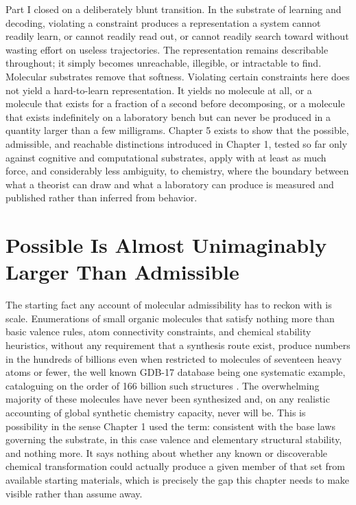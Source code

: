 \documentclass[11pt]{book}
\begin{document}
Part I closed on a deliberately blunt transition. In the substrate of learning and decoding, violating a constraint produces a representation a system cannot readily learn, or cannot readily read out, or cannot readily search toward without wasting effort on useless trajectories. The representation remains describable throughout; it simply becomes unreachable, illegible, or intractable to find. Molecular substrates remove that softness. Violating certain constraints here does not yield a hard-to-learn representation. It yields no molecule at all, or a molecule that exists for a fraction of a second before decomposing, or a molecule that exists indefinitely on a laboratory bench but can never be produced in a quantity larger than a few milligrams. Chapter 5 exists to show that the possible, admissible, and reachable distinctions introduced in Chapter 1, tested so far only against cognitive and computational substrates, apply with at least as much force, and considerably less ambiguity, to chemistry, where the boundary between what a theorist can draw and what a laboratory can produce is measured and published rather than inferred from behavior.

\section{Possible Is Almost Unimaginably Larger Than Admissible}

The starting fact any account of molecular admissibility has to reckon with is scale. Enumerations of small organic molecules that satisfy nothing more than basic valence rules, atom connectivity constraints, and chemical stability heuristics, without any requirement that a synthesis route exist, produce numbers in the hundreds of billions even when restricted to molecules of seventeen heavy atoms or fewer, the well known GDB-17 database being one systematic example, cataloguing on the order of 166 billion such structures \cite{reymond2015}. The overwhelming majority of these molecules have never been synthesized and, on any realistic accounting of global synthetic chemistry capacity, never will be. This is possibility in the sense Chapter 1 used the term: consistent with the base laws governing the substrate, in this case valence and elementary structural stability, and nothing more. It says nothing about whether any known or discoverable chemical transformation could actually produce a given member of that set from available starting materials, which is precisely the gap this chapter needs to make visible rather than assume away.
\end{document}
